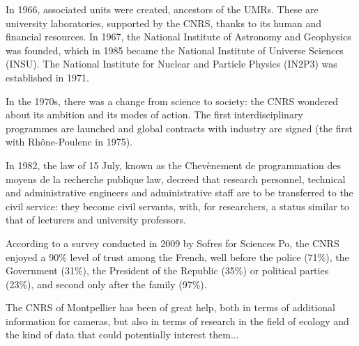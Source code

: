 In 1966, associated units were created, ancestors of the UMRs. These are university laboratories, supported by the CNRS, thanks to its human and financial resources. In 1967, the National Institute of Astronomy and Geophysics was founded, which in 1985 became the National Institute of Universe Sciences (INSU). The National Institute for Nuclear and Particle Physics (IN2P3) was established in 1971.

In the 1970s, there was a change from science to society: the CNRS wondered about its ambition and its modes of action. The first interdisciplinary programmes are launched and global contracts with industry are signed (the first with Rhône-Poulenc in 1975).

In 1982, the law of 15 July, known as the Chevènement de programmation des moyens de la recherche publique law, decreed that research personnel, technical and administrative engineers and administrative staff are to be transferred to the civil service: they become civil servants, with, for researchers, a status similar to that of lecturers and university professors.

According to a survey conducted in 2009 by Sofres for Sciences Po, the CNRS enjoyed a 90\% level of trust among the French, well before the police (71\%), the Government (31\%), the President of the Republic (35\%) or political parties (23\%), and second only after the family (97\%).

The CNRS of Montpellier has been of great help, both in terms of additional information for cameras, but also in terms of research in the field of ecology and the kind of data that could potentially interest them...